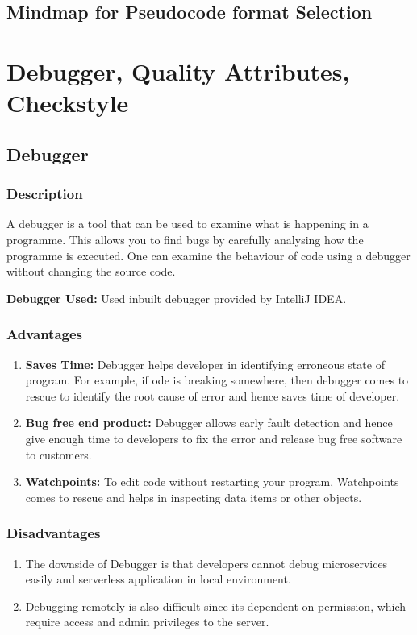 \documentclass[a4paper,12pt]{report}
\begin{document}
\subsection{Mindmap for Pseudocode format Selection}

\section{Debugger, Quality Attributes, Checkstyle}
\subsection{Debugger}
\subsubsection{Description}A debugger is a tool that can be used to examine what is happening in a programme. This allows you to find bugs by carefully analysing how the programme is executed. One can examine the behaviour of code using a debugger without changing the source code.

\textbf{Debugger Used:} Used inbuilt debugger provided by IntelliJ IDEA.

\subsubsection{Advantages}
\begin{enumerate}
    \item \textbf{Saves Time:} Debugger helps developer in identifying erroneous state of program. For example, if ode is breaking somewhere, then debugger comes to rescue to identify the root cause of error and hence saves time of developer.
    \item \textbf{Bug free end product: } Debugger allows early fault detection and hence give enough time to developers to fix the error and release bug free software to customers.
    \item \textbf{Watchpoints: } To edit code without restarting your program, Watchpoints comes to rescue and helps in inspecting data items or other objects.
\end{enumerate}
\subsubsection{Disadvantages}
\begin{enumerate}
    \item The downside of Debugger is that developers cannot debug microservices easily and serverless application in local environment.
    \item Debugging remotely is also difficult since its dependent on permission, which require access and admin privileges to the server.
\end{enumerate}
\end{document}
